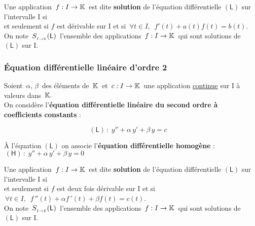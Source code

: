 Une application \(\,f:I\to \mathbb{K}\,\) est dite \textbf{solution} de l'équation différentielle $\left(\mathsf{L} \right)$ sur l'intervalle I si\vspace{0.1cm}\\
et seulement si $f$ est dérivable sur I et si \(\, \forall t \in I,\ \;f'(t)+a(t)f(t)=b(t)\).\vspace{0.3cm}\\
On note \(\,S_{_{I\to\mathbb{K}}}(\mathsf{L})\,\) l'ensemble des applications \(\,f:I\to \mathbb{K}\,\) qui sont solutions de $\left(\mathsf{L}\right)$ sur I.


\vspace{1cm}

\subsubsection[EDL d'ordre 2]{Équation différentielle linéaire d'ordre 2}

\vspace{1cm}

Soient \(\,\alpha,\, \beta\,\) des éléments de \(\,\mathbb{K}\,\) et \(\,c:I\to\mathbb{K}\,\) une application \underline{continue} sur I à valeurs dans \(\,\mathbb{K}.\)\vspace{0.2cm}\\
On considère l'\textbf{équation différentielle linéaire du second ordre à coefficients constants} :\vspace{-0.3cm}

\[(\mathsf{L})\,:\;y''+\alpha\,y'+\beta\,y=c\]

\vspace{0.3cm}

À l'équation $\left(\mathsf{L}\right)$ on associe l'\textbf{équation différentielle homogène} : \(\,(\mathsf{H})\,:\; y''+\alpha\,y'+\beta\,y=0\)

\vspace{1.2cm}

Une application \(\,f:I\to \mathbb{K}\,\) est dite \textbf{solution} de l'équation différentielle $\left(\mathsf{L} \right)$ sur l'intervalle I si\vspace{0.1cm}\\
et seulement si $f$ est deux fois dérivable sur I et si \(\, \forall t \in I,\ \;f\,''(t)+\alpha f\,'(t)+\beta f(t)=c(t)\).\vspace{0.3cm}\\
On note \(\,S_{_{I\to\mathbb{K}}}(\mathsf{L})\,\) l'ensemble des applications \(\,f:I\to \mathbb{K}\,\) qui sont solutions de $\left(\mathsf{L}\right)$ sur I.

\vspace{2cm}